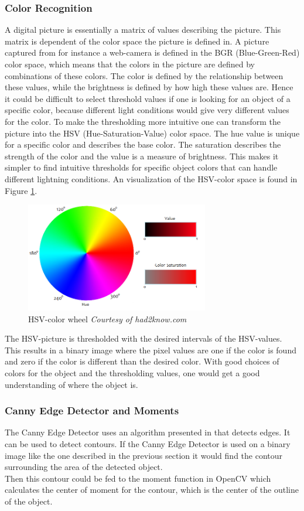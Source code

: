 \subsubsection{Color Recognition}
A digital picture is essentially a matrix of values describing the picture. This matrix is dependent of the color space the picture is defined in. A picture captured from for instance a web-camera is defined in the BGR (Blue-Green-Red) color space, which means that the colors in the picture are defined by combinations of these colors. The color is defined by the relationship between these values, while the brightness is defined by how high these values are. Hence it could be difficult to select threshold values if one is looking for an object of a specific color, because different light conditions would give very different values for the color. To make the thresholding more intuitive one can transform the picture into the HSV (Hue-Saturation-Value) color space. The hue value is unique for a specific color and describes the base color. The saturation describes the strength of the color and the value is a measure of brightness. This makes it simpler to find intuitive thresholds for specific object colors that can handle different lightning conditions. An visualization of the HSV-color space is found in Figure \ref{hsvWheel}. 
\begin{figure}[H]
\centering
\includegraphics[width = 8cm]{fig/hsv.png}
\caption{HSV-color wheel \textit{Courtesy of had2know.com}}
\label{hsvWheel}
\end{figure}\noindent
The HSV-picture is thresholded with the desired intervals of the HSV-values. This results in a binary image where the pixel values are one if the color is found and zero if the color is different than the desired color. With good choices of colors for the object and the thresholding values, one would get a good understanding of where the object is.
\subsubsection{Canny Edge Detector and Moments}
The Canny Edge Detector uses an algorithm presented in \citep{canny} that detects edges. It can be used to detect contours. If the Canny Edge Detector is used on a binary image like the one described in the previous section it would find the contour surrounding the area of the detected object.\\\newline
Then this contour could be fed to the moment function in OpenCV which calculates the center of moment for the contour, which is the center of the outline of the object.
